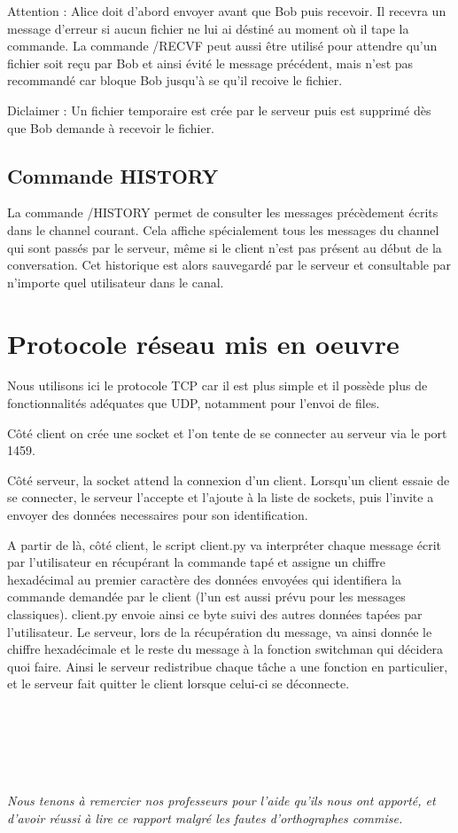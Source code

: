 \documentclass[10pt]{article}
\begin{document}
Attention : Alice doit d'abord envoyer avant que Bob puis recevoir. Il recevra un message d'erreur si aucun fichier ne lui ai déstiné au moment où il tape la commande. 
La commande /RECVF peut aussi être utilisé pour attendre qu'un fichier soit reçu par Bob et ainsi évité le message précédent, mais n'est pas recommandé car bloque Bob jusqu'à se qu'il recoive le fichier.


Diclaimer : Un fichier temporaire est crée par le serveur puis est supprimé dès que Bob demande à recevoir le fichier.

\subsection{Commande HISTORY}

La commande /HISTORY permet de consulter les messages précèdement écrits dans le channel courant.
Cela affiche spécialement tous les messages du channel qui sont passés par le serveur, même si le client n'est pas présent au début de la conversation.
Cet historique est alors sauvegardé par le serveur et consultable par n'importe quel utilisateur dans le canal.


\section{Protocole réseau mis en oeuvre} 

Nous utilisons ici le protocole TCP car il est plus simple et il possède plus de fonctionnalités adéquates que UDP, notamment pour l'envoi de files.

Côté client on crée une socket et l'on tente de se connecter au serveur via le port 1459.

Côté serveur, la socket attend la connexion d'un client.
Lorsqu'un client essaie de se connecter, le serveur l'accepte et l'ajoute à la liste de sockets, puis l'invite a envoyer des données necessaires pour son identification.

A partir de là, côté client, le script client.py va interpréter chaque message écrit par l’utilisateur en récupérant la commande tapé et assigne un chiffre hexadécimal au premier caractère des données envoyées qui identifiera la commande demandée par le client (l’un est aussi prévu pour les messages classiques). 
client.py envoie ainsi ce byte suivi des autres données tapées par l’utilisateur. Le serveur, lors de la récupération du message, va ainsi donnée le chiffre hexadécimale et le reste du message à la fonction switchman qui décidera quoi faire.
Ainsi le serveur redistribue chaque tâche a une fonction en particulier, et le serveur fait quitter le client lorsque celui-ci se déconnecte.\\~\\ \\~\\ \\~\\

    \begin{center}
    
        \textit{Nous tenons à remercier nos professeurs pour l'aide qu'ils nous ont apporté, et d'avoir réussi à lire ce rapport malgré les fautes d'orthographes commise.}
    
    \end{center}
\end{document}
